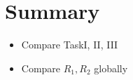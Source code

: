 \documentclass[a4paper, smallheadings,english]{scrartcl}
\begin{document}
\section{Summary}
\begin{itemize}
    \item Compare TaskI, II, III
    \item Compare $R_1, R_2$ globally
\end{itemize}
\end{document}
